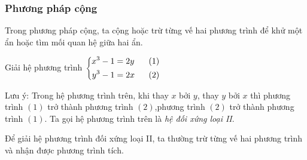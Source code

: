 \subsubsection{Phương pháp cộng}

Trong phương pháp cộng, ta cộng hoặc trừ từng vế hai phương trình để khử một ẩn hoặc tìm mối quan hệ giữa hai ẩn.
\begin{vd}
Giải hệ phương trình $\heva{x^3-1&=2y \ \ &(1)\\ y^3 - 1 &= 2x \ \ &(2)}$
\end{vd}

Lưu ý: Trong hệ phương trình trên, khi thay $x$ bởi $y$, thay $y$ bởi $x$ thì phương trình $(1)$ trở thành phương trình $(2)$,phương trình $(2)$ trở thành phương trình $(1)$. Ta gọi hệ phương trình trên là \textit{hệ đối xứng loại II}.

Để giải hệ phương trình đối xứng loại II, ta thường trừ từng vế hai phương trình và nhận được phương trình tích.

